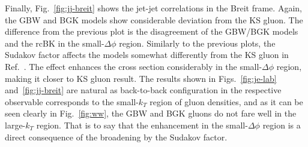 \documentclass[11pt]{article}
\numberwithin{equation}{section}
\numberwithin{table}{section}
\numberwithin{figure}{section}
\begin{document}
Finally, Fig.~\ref{fig:jj-breit} shows the jet-jet correlations in the Breit frame. Again, the GBW and BGK models show considerable deviation from the KS gluon. The difference from the previous plot is the disagreement of the GBW/BGK models and the rcBK in the small-$\Delta\phi$ region. Similarly to the previous plots, the Sudakov factor affects the models somewhat differently from the KS gluon in Ref.~\cite{vanHameren:2021sqc}.
The effect enhances the cross section considerably in the small-$\Delta\phi$ region, making it closer to KS gluon result.
The results shown in Figs.~\ref{fig:je-lab} and~\ref{fig:jj-breit} are natural as back-to-back configuration in the respective observable corresponds to the small-$k_T$ region of gluon densities, and as it can be seen clearly in Fig.~\ref{fig:ww}, the GBW and BGK gluons do not fare well in the large-$k_T$ region. 
That is to say that the enhancement in the small-$\Delta\phi$ region is a direct consequence of the broadening by the Sudakov factor. 
\end{document}
